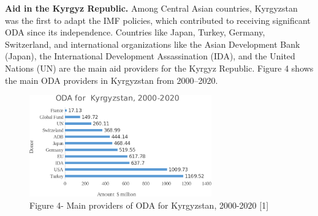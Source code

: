 \begin{multicols}{2}
{\bfseries Aid in the Kyrgyz Republic.} Among Central Asian countries,
Kyrgyzstan was the first to adapt the IMF policies, which contributed to
receiving significant ODA since its independence. Countries like Japan,
Turkey, Germany, Switzerland, and international organizations like the
Asian Development Bank (Japan), the International Development
Assassination (IDA), and the United Nations (UN) are the main aid
providers for the Kyrgyz Republic. Figure 4 shows the main ODA providers
in Kyrgyzstan from 2000--2020.
\end{multicols}

\begin{figure}[H]
	\centering
	\includegraphics[width=0.7\textwidth]{assets/341.3}
	\caption*{Figure 4- Main providers of ODA for Kyrgyzstan, 2000-2020
{[}1{]}}
\end{figure}

